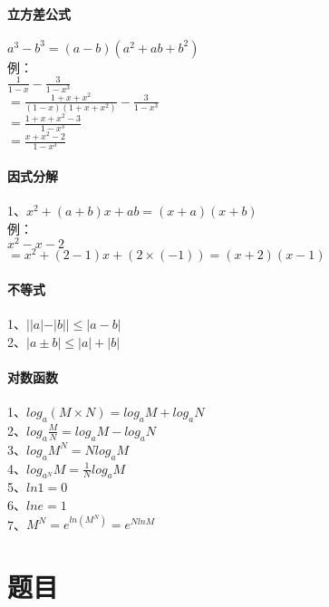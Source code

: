 \documentclass{article}
\begin{document}
\begin{flushleft}
\paragraph{立方差公式}
$a^3-b^3=(a-b)(a^2+ab+b^2)$\\
例：\\
\qquad $\frac{1}{1-x}-\frac{3}{1-x^3}$\\
\qquad $=\frac{1+x+x^2}{(1-x)(1+x+x^2)}-\frac{3}{1-x^3}$\\
\qquad $=\frac{1+x+x^2-3}{1-x^3}$\\
\qquad $=\frac{x+x^2-2}{1-x^3}$\\

\paragraph{因式分解}
1、$x^2+(a+b)x+ab=(x+a)(x+b)$\\
例：\\
\qquad $x^2-x-2$\\
\qquad $=x^2+(2-1)x+(2\times(-1))=(x+2)(x-1)$\\

\paragraph{不等式}
1、$||a|-|b||\le |a-b|$\\
2、$|a\pm b|\le |a|+|b|$\\

\paragraph{对数函数}
1、$log_a(M\times N)=log_aM+log_aN$\\
2、$log_a\frac{M}{N}=log_aM-log_aN$\\
3、$log_aM^N=Nlog_aM$\\
4、$log_{a^N}M=\frac{1}{N}log_aM$\\
5、$ln1=0$\\
6、$lne=1$\\
7、$M^N=e^{ln(M^N)}=e^{NlnM}$\\


\section{题目}


\end{flushleft}
\end{document}
